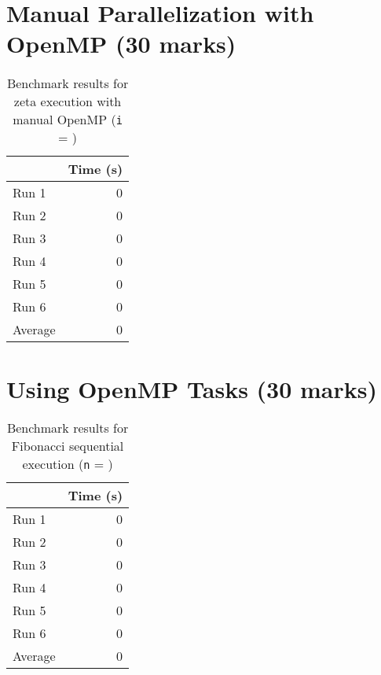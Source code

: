 \documentclass[12pt]{article}
\begin{document}

\section*{Manual Parallelization with OpenMP (30 marks)}

\begin{table}[H]
  \centering
  \begin{tabular}{lr}
    & {\bf Time (s)} \\
    \hline
    Run 1 & 0 \\
    Run 2 & 0 \\
    Run 3 & 0 \\
    Run 4 & 0 \\
    Run 5 & 0 \\
    Run 6 & 0 \\
    \hline
    Average & 0 \\
  \end{tabular}
  \caption{Benchmark results for zeta execution with manual OpenMP ({\tt i} = \zetaIterations{})}
  \label{tbl-zeta-openmp}
\end{table}


\section*{Using OpenMP Tasks (30 marks)}

\begin{table}[H]
  \centering
  \begin{tabular}{lr}
    & {\bf Time (s)} \\
    \hline
    Run 1 & 0 \\
    Run 2 & 0 \\
    Run 3 & 0 \\
    Run 4 & 0 \\
    Run 5 & 0 \\
    Run 6 & 0 \\
    \hline
    Average & 0 \\
  \end{tabular}
  \caption{Benchmark results for Fibonacci sequential execution ({\tt n} = \fibNumber{})}
  \label{tbl-fib-sequential}
\end{table}
\end{document}
